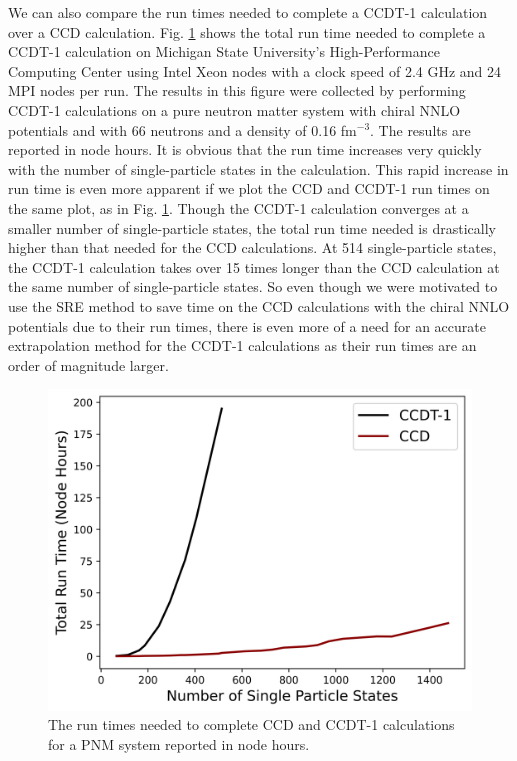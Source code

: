 We can also compare the run times needed to complete a CCDT-1 calculation over a CCD calculation. Fig. \ref{fig:ccd_ccdt1_times} shows the total run time needed to complete a CCDT-1 calculation on Michigan State University's High-Performance Computing Center using Intel Xeon nodes with a clock speed of 2.4 GHz and 24 MPI nodes per run. The results in this figure were collected by performing CCDT-1 calculations on a pure neutron matter system with chiral NNLO potentials and with 66 neutrons and a density of 0.16 fm$^{-3}$. The results are reported in node hours. It is obvious that the run time increases very quickly with the number of single-particle states in the calculation. This rapid increase in run time is even more apparent if we plot the CCD and CCDT-1 run times on the same plot, as in Fig. \ref{fig:ccd_ccdt1_times}.  Though the CCDT-1 calculation converges at a smaller number of single-particle states, the total run time needed is drastically higher than that needed for the CCD calculations. At 514 single-particle states, the CCDT-1 calculation takes over 15 times longer than the CCD calculation at the same number of single-particle states. So even though we were motivated to use the SRE method to save time on the CCD calculations with the chiral NNLO potentials due to their run times, there is even more of a need for an accurate extrapolation method for the CCDT-1 calculations as their run times are an order of magnitude larger.

\begin{figure}
    \centering
    \includegraphics{Images/Chapter7/ORNL/ccdt1 and ccd times.png}
    \caption{The run times needed to complete CCD and CCDT-1 calculations for a PNM system reported in node hours.}
    \label{fig:ccd_ccdt1_times}
\end{figure}


